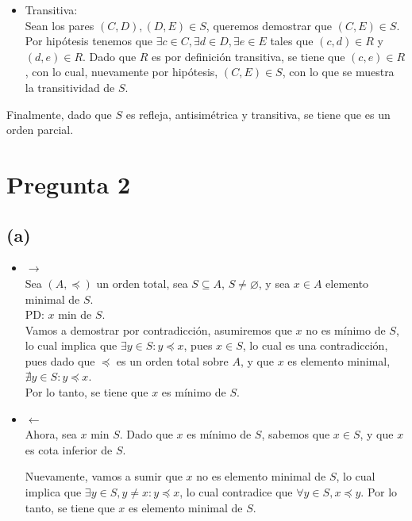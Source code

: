 \documentclass[12pt]{article}
\begin{document}
\begin{enumerate}
\begin{itemize}
        \item Transitiva:\\
        Sean los pares $(C, D), (D, E) \in S$, queremos demostrar que $(C, E) \in S$.
        Por hipótesis tenemos que $\exists c \in C, \exists d \in D, \exists e \in E$ tales que $(c, d) \in R$ y $(d, e) \in R$.
        Dado que $R$ es por definición transitiva, se tiene que $(c, e) \in R$, con lo cual, nuevamente por hipótesis,
        $(C, E) \in S$, con lo que se muestra la transitividad de $S$.
    \end{itemize}

    Finalmente, dado que $S$ es refleja, antisimétrica y transitiva, se tiene que es un orden parcial.

\end{enumerate}

\newpage

\section*{Pregunta 2}

\subsection*{(a)}

\begin{itemize}
    \item $\rightarrow$\\
    Sea $(A, \preceq)$ un orden total, sea $S \subseteq A$, $S \neq \varnothing$, y sea $x \in A$
    elemento minimal de $S$.\\

    PD: $x$ min de $S$.\\
    Vamos a demostrar por contradicción, asumiremos que $x$ no es mínimo de $S$, lo cual implica que
    $\exists y \in S : y \preceq x$, pues $x \in S$, lo cual es una contradicción, pues dado que $\preceq$ es 
    un orden total sobre $A$, y que $x$ es elemento minimal, $\nexists y \in S : y \preceq x$.\\
    Por lo tanto, se tiene que $x$ es mínimo de $S$.

    \item $\leftarrow$\\
    Ahora, sea $x$ min $S$.
    Dado que $x$ es mínimo de $S$, sabemos que $x \in S$, y que $x$ es cota inferior de $S$.

    Nuevamente, vamos a sumir que $x$ no es elemento minimal de $S$, lo cual implica que 
    $\exists y \in S, y \neq x : y \preceq x$, lo cual contradice que $\forall y \in S, x \preceq y$.
    Por lo tanto, se tiene que $x$ es elemento minimal de $S$.
\end{itemize}
\end{document}
